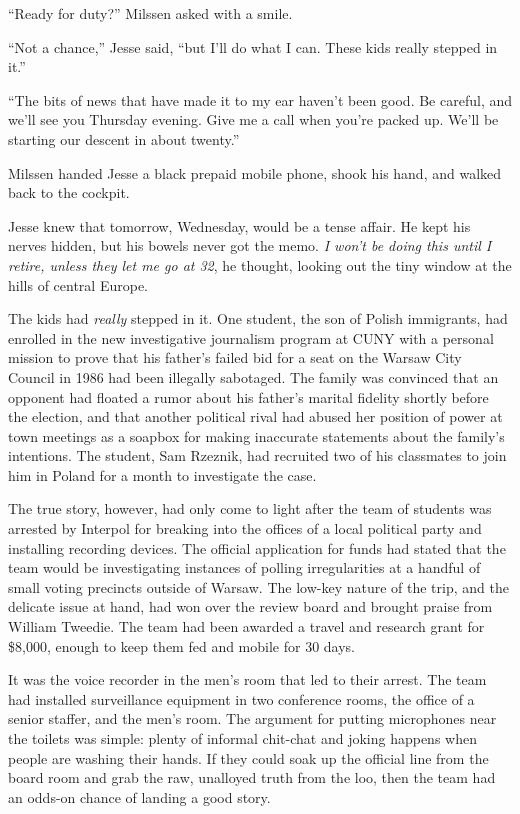 \documentclass[12pt]{book}
\begin{document}
``Ready for duty?'' Milssen asked with a smile.

``Not a chance,'' Jesse said, ``but I'll do what I can.  These kids really stepped in it.''

``The bits of news that have made it to my ear haven't been good.  Be careful, and we'll see you Thursday evening.  Give me a call when you're packed up.  We'll be starting our descent in about twenty.''

Milssen handed Jesse a black prepaid mobile phone, shook his hand, and walked back to the cockpit.

Jesse knew that tomorrow, Wednesday, would be a tense affair.  He kept his nerves hidden, but his bowels never got the memo.  \emph{I won't be doing this until I retire, unless they let me go at 32}, he thought, looking out the tiny window at the hills of central Europe.

The kids had \emph{really} stepped in it.  One student, the son of Polish immigrants, had enrolled in the new investigative journalism program at CUNY with a personal mission to prove that his father's failed bid for a seat on the Warsaw City Council in 1986 had been illegally sabotaged.  The family was convinced that an opponent had floated a rumor about his father's marital fidelity shortly before the election, and that another political rival had abused her position of power at town meetings as a soapbox for making inaccurate statements about the family's intentions.  The student, Sam Rzeznik, had recruited two of his classmates to join him in Poland for a month to investigate the case.

The true story, however, had only come to light after the team of students was arrested by Interpol for breaking into the offices of a local political party and installing recording devices.  The official application for funds had stated that the team would be investigating instances of polling irregularities at a handful of small voting precincts outside of Warsaw.  The low-key nature of the trip, and the delicate issue at hand, had won over the review board and brought praise from William Tweedie.  The team had been awarded a travel and research grant for \$8,000, enough to keep them fed and mobile for 30 days.

It was the voice recorder in the men's room that led to their arrest.  The team had installed surveillance equipment in two conference rooms, the office of a senior staffer, and the men's room.  The argument for putting microphones near the toilets was simple: plenty of informal chit-chat and joking happens when people are washing their hands.  If they could soak up the official line from the board room and grab the raw, unalloyed truth from the loo, then the team had an odds-on chance of landing a good story.
\end{document}
